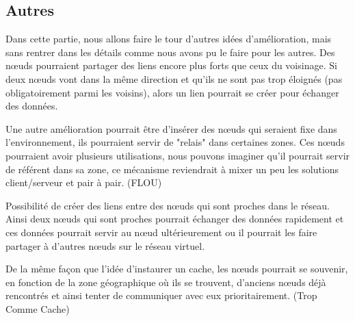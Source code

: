 \newpage
\subsection{Autres}
Dans cette partie, nous allons faire le tour d'autres idées d'amélioration, mais sans rentrer dans les détails comme nous avons pu le faire pour les autres. Des nœuds pourraient partager des liens encore plus forts que ceux du voisinage. Si deux nœuds vont dans la même direction et qu'ils ne sont pas trop éloignés (pas obligatoirement parmi les voisins), alors un lien pourrait se créer pour échanger des données.

\par Une autre amélioration pourrait être d'insérer des nœuds qui seraient fixe dans l'environnement, ils pourraient servir de "relais" dans certaines zones. Ces nœuds pourraient avoir plusieurs utilisations, nous pouvons imaginer qu'il pourrait servir de référent dans sa zone, ce mécanisme reviendrait à mixer un peu les solutions client/serveur et pair à pair. (FLOU)

\par Possibilité de créer des liens entre des nœuds qui sont proches dans le réseau. Ainsi deux nœuds qui sont proches pourrait échanger des données rapidement et ces données pourrait servir au nœud ultérieurement ou il pourrait les faire partager à d'autres nœuds sur le réseau virtuel. 
 
\par De la même façon que l'idée d'instaurer un cache, les nœuds pourrait se souvenir, en fonction de la zone géographique où ils se trouvent, d'anciens nœuds déjà rencontrés et ainsi tenter de communiquer avec eux prioritairement. (Trop Comme Cache)



